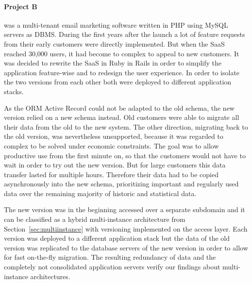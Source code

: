 \paragraph{Project B} was a multi-tenant email marketing software written in PHP using MySQL servers as DBMS.
During the first years after the launch a lot of feature requests from their early customers were directly implemented.
But when the SaaS reached 30,000 users, it had become to complex to appeal to new customers.
It was decided to rewrite the SaaS in Ruby in Rails in order to simplify the application feature-wise and to redesign the user experience.
In order to isolate the two versions from each other both were deployed to different application stacks.

As the ORM Active Record could not be adapted to the old schema, the new version relied on a new schema instead.
Old customers were able to migrate all their data from the old to the new system.
The other direction, migrating back to the old version, was nevertheless unsupported, because it was regarded to complex to be solved under economic constraints.
The goal was to allow productive use from the first minute on, so that the customers would not have to wait in order to try out the new version.
But for large customers this data transfer lasted for multiple hours.
Therefore their data had to be copied asynchronously into the new schema, prioritizing important and regularly used data over the remaining majority of historic and statistical data.

The new version was in the beginning accessed over a separate subdomain and it can be classified as a hybrid multi-instance architecture from Section~\ref{sec:multiinstance} with versioning implemented on the access layer.
Each version was deployed to a different application stack but the data of the old version was replicated to the database servers of the new version in order to allow for fast on-the-fly migration.
The resulting redundancy of data and the completely not consolidated application servers verify our findings about multi-instance architectures.







